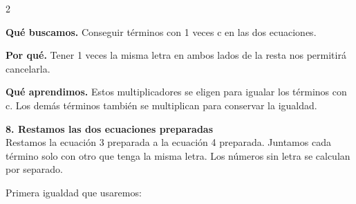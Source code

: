 \documentclass[11pt,a4paper,landscape]{article}
\begin{document}
\begin{multicols*}{2}
\begin{minipage}{\linewidth}
\par\smallskip\textbf{Qué buscamos.} Conseguir términos con 1 veces c en las dos ecuaciones.
\par\smallskip\textbf{Por qué.} Tener 1 veces la misma letra en ambos lados de la resta nos permitirá cancelarla.
\par{}\par\smallskip
\par\smallskip\textbf{Qué aprendimos.} Estos multiplicadores se eligen para igualar los términos con c. Los demás términos también se multiplican para conservar la igualdad.
\end{minipage}\par\medskip
\noindent\begin{minipage}{\linewidth}\textbf{8. Restamos las dos ecuaciones preparadas}\\[2pt]Restamos la ecuación 3 preparada a la ecuación 4 preparada. Juntamos cada término solo con otro que tenga la misma letra. Los números sin letra se calculan por separado.
\par{}\par\smallskip
\par\smallskip Primera igualdad que usaremos:

\end{minipage}
\end{multicols*}
\end{document}
